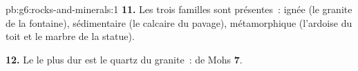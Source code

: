 \begin{solution}{pb:g6:rocks-and-minerals:1}
\textbf{11.} Les trois familles sont présentes~: ignée (le granite de la
fontaine), sédimentaire (le calcaire du pavage), métamorphique (l'ardoise
du toit et le marbre de la statue).

\textbf{12.} Le  le plus dur est le quartz du granite~:  de
Mohs \textbf{7}.
\end{solution}
